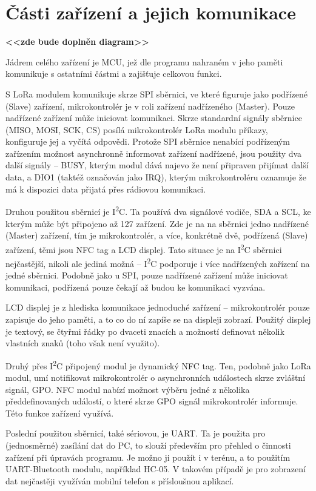 \section{Části zařízení a jejich komunikace}

\begin{center}
     \textbf{<<zde bude doplněn diagram>>}
\end{center}

Jádrem celého zařízení je MCU, jež dle programu nahraném v jeho paměti komunikuje s ostatními částmi a zajišťuje celkovou funkci.

S LoRa modulem komunikuje skrze SPI sběrnici, ve které figuruje jako podřízené (Slave) zařízení, mikrokontrolér je v roli zařízení nadřízeného (Master). Pouze nadřízené zařízení může iniciovat komunikaci. Skrze standardní signály sběrnice (MISO, MOSI, SCK, CS) posílá mikrokontrolér LoRa modulu příkazy, konfiguruje jej a vyčítá odpovědi. Protože SPI sběrnice nenabící podřízeným zařízením možnost asynchronně informovat zařízení nadřízené, jsou použity dva další signály -- BUSY, kterým modul dává najevo že není připraven přijímat další data, a DIO1 (taktéž označován jako IRQ), kterým mikrokontroléru oznamuje že má k dispozici data přijatá přes rádiovou komunikaci.

Druhou použitou sběrnicí je I\textsuperscript{2}C. Ta používá dva signálové vodiče, SDA a SCL, ke kterým může být připojeno až 127 zařízení. Zde je na na sběrnici jedno nadřízené (Master) zařízení, tím je mikrokontrolér, a více, konkrétně dvě, podřízená (Slave) zařízení, těmi jsou NFC tag a LCD displej. Tato situace je na I\textsuperscript{2}C sběrnici nejčastější, nikoli ale jediná možná -- I\textsuperscript{2}C podporuje i více nadřízených zařízení na jedné sběrnici. Podobně jako u SPI, pouze nadřízené zařízení může iniciovat komunikaci, podřízená pouze čekají až budou ke komunikaci vyzvána.

LCD displej je z hlediska komunikace jednoduché zařízení -- mikrokontrolér pouze zapisuje do jeho paměti, a to co do ní zapíše se na displeji zobrazí. Použitý displej je textový, se čtyřmi řádky po dvaceti znacích a možností definovat několik vlastních znaků (toho však není využito).

Druhý přes I\textsuperscript{2}C připojený modul je dynamický NFC tag. Ten, podobně jako LoRa modul, umí notifikovat mikrokontrolér o asynchronních událostech skrze zvláštní signál, GPO. NFC modul nabízí možnost výběru jedné z několika předdefinovaných událostí, o které skrze GPO signál mikrokontrolér informuje. Této funkce zařízení využívá.

Poslední použitou sběrnicí, také sériovou, je UART. Ta je použita pro (jednosměrné) zasílání dat do PC, to slouží především pro přehled o činnosti zařízení při úpravách programu. Je možno ji použít i v terénu, a to použitím UART-Bluetooth modulu, například HC-05. V takovém případě je pro zobrazení dat nejčastěji využíván mobilní telefon s přísloušnou aplikací.
